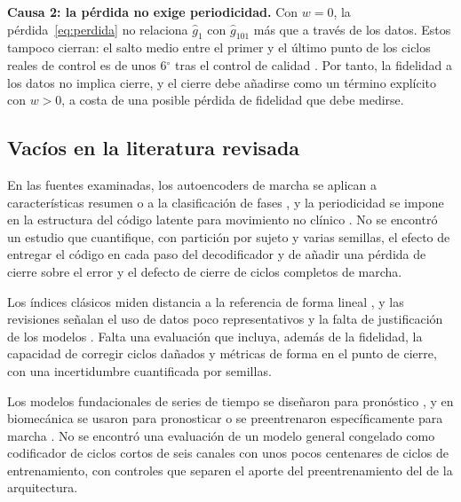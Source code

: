 \documentclass[11pt,a4paper]{article}
\newcommand{\gr}{$^{\circ}$}
\begin{document}
\textbf{Causa 2: la pérdida no exige periodicidad.} Con $w=0$, la pérdida~\eqref{eq:perdida} no relaciona $\hat g_1$ con $\hat g_{101}$ más que a través de los datos. Estos tampoco cierran: el salto medio entre el primer y el último punto de los ciclos reales de control es de unos $6$\gr{} tras el control de calidad \cite{neurostride2026}. Por tanto, la fidelidad a los datos no implica cierre, y el cierre debe añadirse como un término explícito con $w>0$, a costa de una posible pérdida de fidelidad que debe medirse.

\subsection{Vacíos en la literatura revisada}

\begin{description}[leftmargin=2.2em,style=nextline]
\item[V1. Reconstrucción periódica de ciclos completos.] En las fuentes examinadas, los autoencoders de marcha se aplican a características resumen o a la clasificación de fases \cite{wang2024,pang2025}, y la periodicidad se impone en la estructura del código latente para movimiento no clínico \cite{starke2022}. No se encontró un estudio que cuantifique, con partición por sujeto y varias semillas, el efecto de entregar el código en cada paso del decodificador y de añadir una pérdida de cierre sobre el error y el defecto de cierre de ciclos completos de marcha.
\item[V2. Modelos normativos con evaluación de corrección y de forma.] Los índices clásicos miden distancia a la referencia de forma lineal \cite{schwartz2008,baker2009}, y las revisiones señalan el uso de datos poco representativos y la falta de justificación de los modelos \cite{samadi2024}. Falta una evaluación que incluya, además de la fidelidad, la capacidad de corregir ciclos dañados y métricas de forma en el punto de cierre, con una incertidumbre cuantificada por semillas.
\item[V3. Modelos fundacionales como codificadores para ciclos de marcha.] Los modelos fundacionales de series de tiempo se diseñaron para pronóstico \cite{das2024timesfm,woo2024,ansari2024chronos}, y en biomecánica se usaron para pronosticar \cite{akbarifar2025} o se preentrenaron específicamente para marcha \cite{dey2025}. No se encontró una evaluación de un modelo general congelado como codificador de ciclos cortos de seis canales con unos pocos centenares de ciclos de entrenamiento, con controles que separen el aporte del preentrenamiento del de la arquitectura.
\end{description}
\end{document}
